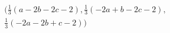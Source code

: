 \begin{multline*}
 \bigl( \frac{1}{3}(a-2b-2c-2),\frac{1}{3}(-2a+b-2c-2),\\
\frac{1}{3}(-2a-2b+c-2)\bigr) 
\end{multline*}
